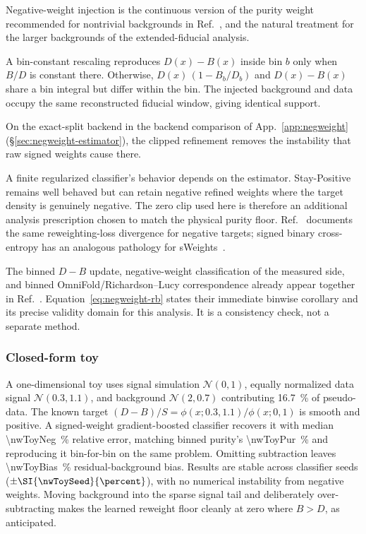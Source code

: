 Negative-weight injection is the continuous version of the purity weight recommended for nontrivial backgrounds in Ref.~\cite{Canelli:2025guide}, and the natural treatment for the larger backgrounds of the extended-fiducial analysis.

A bin-constant rescaling reproduces $D(x)-B(x)$ inside bin $b$ only when $B/D$ is constant there. Otherwise, $D(x)\,(1-B_{b}/D_{b})$ and $D(x)-B(x)$ share a bin integral but differ within the bin. The injected background and data occupy the same reconstructed fiducial window, giving identical support.

On the exact-split backend in the backend comparison of App.~\ref{app:negweight} (\S\ref{sec:negweight-estimator}), the clipped refinement removes the instability that raw signed weights cause there.

A finite regularized classifier's behavior depends on the estimator. Stay-Positive remains well behaved but can retain negative refined weights where the target density is genuinely negative. The zero clip used here is therefore an additional analysis prescription chosen to match the physical purity floor. Ref.~\cite{Nachman:2025staypositive} documents the same reweighting-loss divergence for negative targets; signed binary cross-entropy has an analogous pathology for sWeights~\cite{GlazierTyson:2024}.

The binned $D-B$ update, negative-weight classification of the measured side, and binned OmniFold/Richardson--Lucy correspondence already appear together in Ref.~\cite{Andreassen:2021zzk}. Equation~\eqref{eq:negweight-rb} states their immediate binwise corollary and its precise validity domain for this analysis. It is a consistency check, not a separate method.

\subsubsection{Closed-form toy}

A one-dimensional toy uses signal simulation $\mathcal{N}(0,1)$, equally normalized data signal $\mathcal{N}(0.3,1.1)$, and background $\mathcal{N}(2,0.7)$ contributing \SI{16.7}{\percent} of pseudo-data. The known target $(D-B)/S=\phi(x;0.3,1.1)/\phi(x;0,1)$ is smooth and positive. A signed-weight gradient-boosted classifier recovers it with median \SI{\nwToyNeg}{\percent} relative error, matching binned purity's \SI{\nwToyPur}{\percent} and reproducing it bin-for-bin on the same problem. Omitting subtraction leaves \SI{\nwToyBias}{\percent} residual-background bias. Results are stable across classifier seeds ($\pm\SI{\nwToySeed}{\percent}$), with no numerical instability from negative weights. Moving background into the sparse signal tail and deliberately over-subtracting makes the learned reweight floor cleanly at zero where $B>D$, as anticipated.

